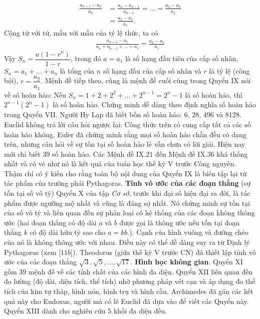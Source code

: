 \begin{multicols}{2}
\begin{align*}
		\frac{a_{n+1} - a_n}{a_n} &= \frac{a_n - a_{n-1}}{a_{n-1}} = \ldots = \frac{a_3 - a_2}{a_2} \\
		&= \frac{a_2 - a_1}{a_1}.		
	\end{align*}
	Cộng tử với tử, mẫu với mẫu của tỷ lệ thức, ta có
	\begin{align*}
		\frac{a_{n+1} - a_1}{a_n + a_{n-1} + \ldots + a_1} = \frac{a_2 - a_1}{a_1}		
	\end{align*}
	Vậy  $S_n = \dfrac{a(1-r^n)}{1 -r}$,
	\vskip 0.1cm 
	trong đó $a = a_1$  là số hạng đầu tiên của cấp số nhân, $S_n = a_1 + \ldots + a_n$  là tổng của $n$  số hạng đầu của cấp số nhân và  $r$ là tỷ lệ (công bội), $r = \dfrac{a_2}{a_1}$.
	\vskip 0.1cm  
	Mệnh đề tiếp theo, cũng là mệnh đề cuối cùng trong Quyển IX nói về só hoàn hảo: Nếu  $S_n = 1 + 2 + 2^2 + \ldots + 2^{n-1} = 2^n -1$ là số hoàn hảo, thì  $2^{n-1}\left(2^n - 1\right)$ là số hoàn hảo. Chứng minh dễ dàng theo định nghĩa số hoàn hảo trong Quyển VII. Người Hy Lạp đã biết bốn số hoàn hảo: $6$, $28$, $496$ và $8128$.  Euclid không trả lời câu hỏi ngược lại: Công thức trên có cung cấp tất cả các số hoàn hảo không. Euler đã chứng minh rằng mọi số hoàn hảo chẵn đều có dạng trên, nhưng câu hỏi về sự tồn tại số hoàn hảo lẻ vẫn chưa có lời giải. Hiện nay mới chỉ biết $39$ số hoàn hảo.
	\vskip 0.1cm
	Các Mệnh đề IX.$21$ đến Mệnh đề IX.$36$ khá thống nhất và có vẻ như nó là kết quả của toán học thế kỷ V trước Công nguyên. Thậm chí có ý kiến cho rằng toàn bộ nội dung của Quyển IX là biên tập lại từ tác phẩm của trường phái Pythagoras.
	\vskip 0.1cm
	\textbf{\color{lichsutoanhoc}Tính vô ước của các đoạn thẳng} (sự tồn tại số vô tỷ) Quyển X của tập \textit{Cơ sở}, trước khi đại số hiện đại ra đời, là tác phẩm được ngưỡng mộ nhất và cũng là đáng sợ nhất. Nó chứng minh sự tồn tại của số vô tỷ và liên quan đến sự phân loại có hệ thống của các đoạn không thông ước (hai đoạn thẳng có độ dài $a$  và $b$  được gọi là thông ước nếu tồn tại đoạn thẳng $k$  có độ dài hữu tỷ sao cho  $a = kb.$). Cạnh của hình vuông và đường chéo của nó là không thông ước với nhau. Điều này có thể dễ dàng suy ra từ Định lý Pythagoras (xem [$11b$]). Theodorus (giữa thế kỷ V trước CN) đã thiết lập tính vô ước của các đoạn thẳng $\sqrt{3}, \sqrt{5},\ldots, \sqrt{17}$.
	\vskip 0.1cm
	\textbf{\color{lichsutoanhoc}Hình học không gian}. Quyển XI gồm $39$ mệnh đề về các tính chất của các hình đa diện. Quyển XII liên quan đến đo lường (độ dài, diện tích, thể tích)  nhờ phương pháp vét cạn và áp dụng đo thể tích của kim tự tháp, hình nón, hình trụ và hình cầu. Archimedes đã gán các kết quả này cho Eudoxus, người mà có lẽ Euclid đã dựa vào để viết các Quyển này.  Quyển XIII dành cho nghiên cứu $5$ khối đa diện đều.

\end{multicols}
